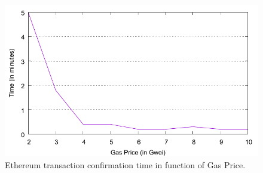 \documentclass[letterpaper,twocolumn,10pt]{article}
\begin{document}
\begin{figure}[t]
  \centering 
  \includegraphics[width=\columnwidth]{final-figures/ethereum-confirmation-time.pdf}
  \vspace{-10pt}
  \caption{Ethereum transaction confirmation time in function of Gas Price.}
  \label{fig:confirmationtime}
\end{figure}
\end{document}
